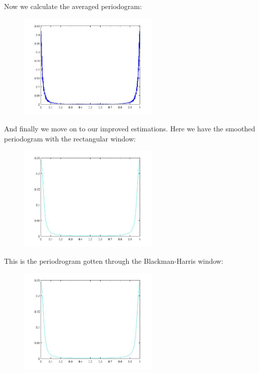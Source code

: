 \documentclass[a4paper,11pt]{article}
\begin{document}
\newpage

Now we calculate the averaged periodogram:

\begin{figure}[!hp]
    \begin{center}
    \includegraphics[width=0.6\textwidth]{images/lab2_redo_figure4.jpg}
    \end{center}
\end{figure}

And finally we move on to our improved estimations. Here we have the smoothed periodogram with the rectangular window:

\begin{figure}[!hp]
    \begin{center}
    \includegraphics[width=0.6\textwidth]{images/lab2_redo_figure5.jpg}
    \end{center}
\end{figure}

\newpage

This is the periodrogram gotten through the Blackman-Harris window:

\begin{figure}[!hp]
    \begin{center}
    \includegraphics[width=0.6\textwidth]{images/lab2_redo_figure6.jpg}
    \end{center}
\end{figure}
\end{document}
